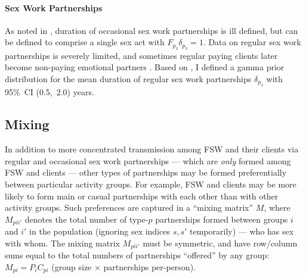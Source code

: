 \paragraph{Sex Work Partnerships}
As noted in , duration of occasional sex work partnerships
is ill defined, but can be defined to comprise a single sex act with $F_{p_{3}}\delta_{p_{3}} = 1$.
Data on regular sex work partnerships is severely limited, and
sometimes regular paying clients later become
non-paying emotional partners \cite{Voeten2007,Mbonye2022}.
Based on \cite{Voeten2002}, I defined a gamma prior distribution for
the mean duration of regular sex work partnerships $\delta_{p_{4}}$ with 95\%~CI (0.5,~2.0) years.
\subsection{Mixing}\label{model.par.mix}
In addition to more concentrated transmission
among FSW and their clients via regular and occasional sex work partnerships
--- which are \emph{only} formed among FSW and clients ---
other types of partnerships may be formed
preferentially between particular activity groups.
For example, FSW and clients may be more likely to form main or casual partnerships
with each other than with other activity groups.
Such preferences are captured in a ``mixing matrix'' $M$, where $M_{pii'}$ denotes
the total number of type-$p$ partnerships formed between groups $i$ and $i'$ in the population
(ignoring sex indices $s,s'$ temporarily)
--- \ie who has sex with whom.
The mixing matrix $M_{pii'}$ must be symmetric,
and have row/column sums equal to the total numbers of partnerships ``offered'' by any group:
$M_{pi} = P_{i} C_{pi}$ (group size $\times$ partnerships per-person).

